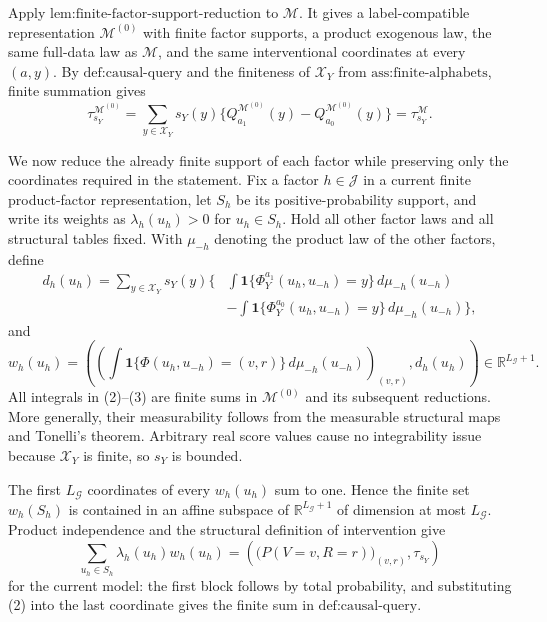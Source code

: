 Apply \(\text{lem:finite-factor-support-reduction}\) to \(\mathcal M\). It gives a label-compatible representation \(\mathcal M^{(0)}\) with finite factor supports, a product exogenous law, the same full-data law as \(\mathcal M\), and the same interventional coordinates at every \((a,y)\). By \(\text{def:causal-query}\) and the finiteness of \(\mathcal X_Y\) from \(\text{ass:finite-alphabets}\), finite summation gives
\[
\tau_{s_Y}^{\mathcal M^{(0)}}
=\sum_{y\in\mathcal X_Y}s_Y(y)
\{Q_{a_1}^{\mathcal M^{(0)}}(y)-Q_{a_0}^{\mathcal M^{(0)}}(y)\}
=\tau_{s_Y}^{\mathcal M}.
\tag{1}
\]

We now reduce the already finite support of each factor while preserving only the coordinates required in the statement. Fix a factor \(h\in\mathcal J\) in a current finite product-factor representation, let \(S_h\) be its positive-probability support, and write its weights as \(\lambda_h(u_h)>0\) for \(u_h\in S_h\). Hold all other factor laws and all structural tables fixed. With \(\mu_{-h}\) denoting the product law of the other factors, define
\[
\begin{aligned}
d_h(u_h)
=\sum_{y\in\mathcal X_Y}s_Y(y)\Bigg\{&
\int\mathbf 1\{\Phi_Y^{a_1}(u_h,u_{-h})=y\}\,d\mu_{-h}(u_{-h})\\
&-\int\mathbf 1\{\Phi_Y^{a_0}(u_h,u_{-h})=y\}\,d\mu_{-h}(u_{-h})
\Bigg\},
\end{aligned}
\tag{2}
\]
and
\[
w_h(u_h)=\left(
\left(
\int\mathbf 1\{\Phi(u_h,u_{-h})=(v,r)\}\,d\mu_{-h}(u_{-h})
\right)_{(v,r)},
d_h(u_h)
\right)\in\mathbb R^{L_{\mathcal G}+1}.
\tag{3}
\]
All integrals in (2)--(3) are finite sums in \(\mathcal M^{(0)}\) and its subsequent reductions. More generally, their measurability follows from the measurable structural maps and Tonelli's theorem. Arbitrary real score values cause no integrability issue because \(\mathcal X_Y\) is finite, so \(s_Y\) is bounded.

The first \(L_{\mathcal G}\) coordinates of every \(w_h(u_h)\) sum to one. Hence the finite set \(w_h(S_h)\) is contained in an affine subspace of \(\mathbb R^{L_{\mathcal G}+1}\) of dimension at most \(L_{\mathcal G}\). Product independence and the structural definition of intervention give
\[
\sum_{u_h\in S_h}\lambda_h(u_h)w_h(u_h)
=\left(
\bigl(P(V=v,R=r)\bigr)_{(v,r)},
\tau_{s_Y}
\right)
\tag{4}
\]
for the current model: the first block follows by total probability, and substituting (2) into the last coordinate gives the finite sum in \(\text{def:causal-query}\).


